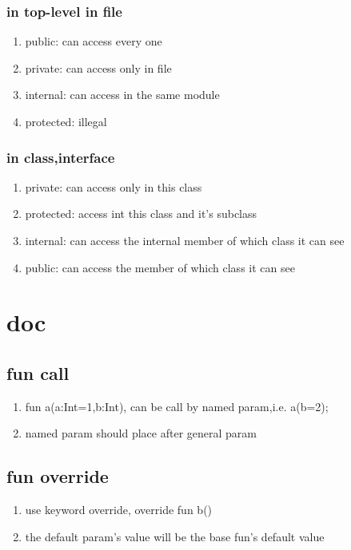 \documentclass{article}
\begin{document}
            \subsubsection{in top-level in file}
                 \begin{enumerate}
                    \item public: can access every one
                    \item private: can access only in file
                    \item internal: can access in the same module
                    \item protected: illegal
                 \end{enumerate}
            \subsubsection{in class,interface}
                \begin{enumerate}
                    \item private: can access only in this class
                    \item protected: access int this class and it's subclass
                    \item internal: can access the internal member of which class it can see 
                    \item public: can access the member of which class it can see
                \end{enumerate}
                
\newpage
\section{doc}
    \subsection{fun call}
         \begin{enumerate}
            \item fun a(a:Int=1,b:Int){}, can be call by named param,i.e. a(b=2);
            \item named param should place after general param
         \end{enumerate}
    \subsection{fun override}
         \begin{enumerate}
             \item use keyword override, override fun b(){}
             \item the default param's value will be the base fun's default value
         \end{enumerate}
\end{document}
